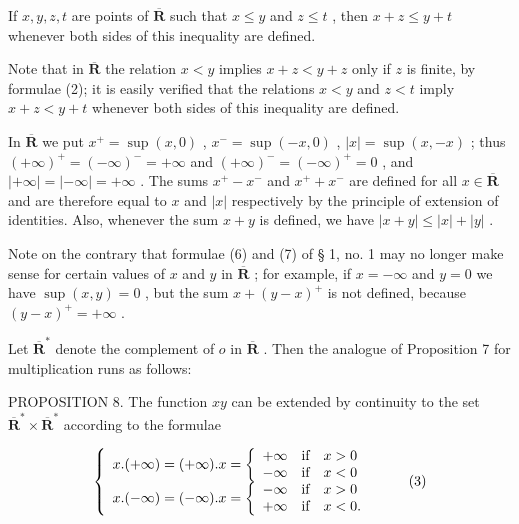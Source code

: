 If \(x, y, z, t\) are points of \(\overline{\mathbf{R}}\) such that \(x \leqslant y\) and \(z \leqslant t\) , then \(x + z \leqslant y + t\) whenever both sides of this inequality are defined.

Note that in \(\overline{\mathbf{R}}\) the relation \(x < y\) implies \(x + z < y + z\) only if \(z\) is finite, by formulae (2); it is easily verified that the relations \(x < y\) and \(z < t\) imply \(x + z < y + t\) whenever both sides of this inequality are defined.

In \(\overline{\mathbf{R}}\) we put \(x^{+} = \sup (x,0)\) , \(x^{-} = \sup (-x,0)\) , \(|x| = \sup (x, - x)\) ; thus \((+\infty)^{+} = (-\infty)^{-} = +\infty\) and \((+\infty)^{-} = (-\infty)^{+} = 0\) , and \(|+\infty| = |- \infty| = +\infty\) . The sums \(x^{+} - x^{-}\) and \(x^{+} + x^{-}\) are defined for all \(x \in \overline{\mathbf{R}}\) and are therefore equal to \(x\) and \(|x|\) respectively by the principle of extension of identities. Also, whenever the sum \(x + y\) is defined, we have \(|x + y| \leqslant |x| + |y|\) .

Note on the contrary that formulae (6) and (7) of § 1, no. 1 may no longer make sense for certain values of \(x\) and \(y\) in \(\overline{\mathbf{R}}\) ; for example, if \(x = -\infty\) and \(y = 0\) we have \(\sup (x, y) = 0\) , but the sum \(x + (y - x)^+\) is not defined, because \((y - x)^+ = +\infty\) .

Let \(\overline{\mathbf{R}}^{*}\) denote the complement of \(o\) in \(\overline{\mathbf{R}}\) . Then the analogue of Proposition 7 for multiplication runs as follows:

PROPOSITION 8. The function \(xy\) can be extended by continuity to the set \(\overline{\mathbf{R}}^* \times \overline{\mathbf{R}}^*\) according to the formulae

\[
\left\{ \begin{array}{l} x. (+ \infty) = (+ \infty). x = \left\{ \begin{array}{l l} + \infty & \text {if} \quad x > 0 \\ - \infty & \text {if} \quad x <   0 \end{array} \right. \\ x. (- \infty) = (- \infty). x = \left\{ \begin{array}{l l} - \infty & \text {if} \quad x > 0 \\ + \infty & \text {if} \quad x <   0. \end{array} \right. \end{array} \right.\tag{3}
\]

